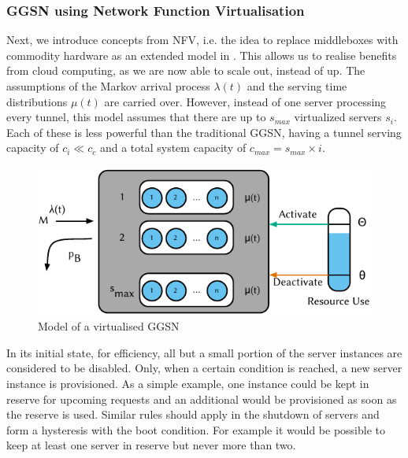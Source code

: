 \subsubsection*{GGSN using Network Function Virtualisation}\label{sec:cloud:virtualized_network_functions:model:virtual_ggsn}
Next, we introduce concepts from \gls{NFV}, i.e. the idea to replace middleboxes with commodity hardware as an extended model in . 
This allows us to realise benefits from cloud computing, as we are now able to scale out, instead of up.
The assumptions of the Markov arrival process \(\lambda(t)\) and the serving time distributions \(\mu(t)\) are carried over.
However, instead of one server processing every tunnel, this model assumes that there are up to \(s_{max}\) virtualized servers \(s_i\).
Each of these is less powerful than the traditional \gls{GGSN}, having a tunnel serving capacity of \(c_i \ll c_c\) and a total system capacity of \(c_{max} = s_{max} \times i\).

\begin{figure}
  \centering
  \includegraphics{cloud/virtualized_network_functions/model/figures/virtual_ggsn}
  \caption{Model of a virtualised GGSN}
  \label{sec:cloud:virtualized_network_functions:model:virtual_ggsn:model}
\end{figure} 

In its initial state, for efficiency, all but a small portion of the server instances are considered to be disabled.
Only, when a certain condition is reached, a new server instance is provisioned.
As a simple example, one instance could be kept in reserve for upcoming requests and an additional would be provisioned as soon as the reserve is used.
Similar rules should apply in the shutdown of servers and form a hysteresis with the boot condition.
For example it would be possible to keep at least one server in reserve but never more than two.

